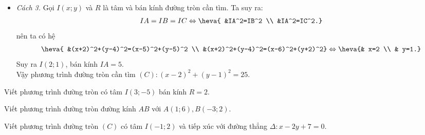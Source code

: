 \begin{bt}
{\begin{itemize}
\begin{align*}
				\end{align*} 
				Vậy phương trình đường tròn cần tìm là $x^2+y^2-4x-2y-20=0 $.
				\item \textit{Cách 3.} Gọi $I\left(x;y\right)$ và $R$ là tâm và bán kính đường tròn cần tìm. Ta suy ra:
				\begin{align*}
					IA=IB=IC \Leftrightarrow \heva{
						&IA^2=IB^2 \\
						&IA^2=IC^2.}
				\end{align*}
				nên ta có hệ 
				\begin{align*}
					\heva{
						&(x+2)^2+(y-4)^2=(x-5)^2+(y-5)^2 \\
						&(x+2)^2+(y-4)^2=(x-6)^2+(y+2)^2}
					\Leftrightarrow \heva{& x=2 \\
						& y=1.}
				\end{align*}
				Suy ra $I(2; 1)$, bán kính $IA=5$.\\
				Vậy phương trình đường tròn cần tìm $(C):(x-2)^2+(y-1)^2=25$.
			\end{itemize}
		}
	\end{bt}

\begin{bt}%
	Viết phương trình đường tròn có tâm $I(3;-5)$ bán kính $R=2$.
\end{bt}

\begin{bt}%
	Viết phương trình đường tròn đường kính $AB$ với $A\left(1;6\right),B\left(-3;2\right)$.
\end{bt}

\begin{bt}%
	Viết phương trình đường tròn $(C)$ có tâm $I\left(-1;2\right)$ và tiếp xúc với đường thẳng $\Delta \colon x-2y+7=0$.
\end{bt}

